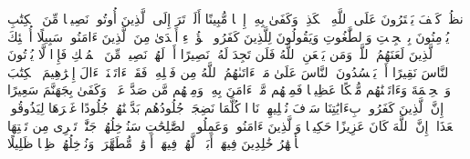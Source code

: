 \stopbuffer%
\startbuffer[\q:4:50]
ٱنظُرۡ كَیۡفَ یَفۡتَرُونَ عَلَى ٱللَّهِ ٱلۡكَذِبَۖ وَكَفَىٰ بِهِۦۤ إِثۡمࣰا مُّبِینًا%
\stopbuffer%
\startbuffer[\q:4:51]
أَلَمۡ تَرَ إِلَى ٱلَّذِینَ أُوتُوا۟ نَصِیبࣰا مِّنَ ٱلۡكِتَٰبِ یُؤۡمِنُونَ بِٱلۡجِبۡتِ وَٱلطَّٰغُوتِ وَیَقُولُونَ لِلَّذِینَ كَفَرُوا۟ هَٰۤؤُلَاۤءِ أَهۡدَىٰ مِنَ ٱلَّذِینَ ءَامَنُوا۟ سَبِیلًا%
\stopbuffer%
\startbuffer[\q:4:52]
أُو۟لَٰۤئِكَ ٱلَّذِینَ لَعَنَهُمُ ٱللَّهُۖ وَمَن یَلۡعَنِ ٱللَّهُ فَلَن تَجِدَ لَهُۥ نَصِیرًا%
\stopbuffer%
\startbuffer[\q:4:53]
أَمۡ لَهُمۡ نَصِیبࣱ مِّنَ ٱلۡمُلۡكِ فَإِذࣰا لَّا یُؤۡتُونَ ٱلنَّاسَ نَقِیرًا%
\stopbuffer%
\startbuffer[\q:4:54]
أَمۡ یَحۡسُدُونَ ٱلنَّاسَ عَلَىٰ مَاۤ ءَاتَىٰهُمُ ٱللَّهُ مِن فَضۡلِهِۦۖ فَقَدۡ ءَاتَیۡنَاۤ ءَالَ إِبۡرَٰهِیمَ ٱلۡكِتَٰبَ وَٱلۡحِكۡمَةَ وَءَاتَیۡنَٰهُم مُّلۡكًا عَظِیمࣰا%
\stopbuffer%
\startbuffer[\q:4:55]
فَمِنۡهُم مَّنۡ ءَامَنَ بِهِۦ وَمِنۡهُم مَّن صَدَّ عَنۡهُۚ وَكَفَىٰ بِجَهَنَّمَ سَعِیرًا%
\stopbuffer%
\startbuffer[\q:4:56]
إِنَّ ٱلَّذِینَ كَفَرُوا۟ بِءَایَٰتِنَا سَوۡفَ نُصۡلِیهِمۡ نَارࣰا كُلَّمَا نَضِجَتۡ جُلُودُهُم بَدَّلۡنَٰهُمۡ جُلُودًا غَیۡرَهَا لِیَذُوقُوا۟ ٱلۡعَذَابَۗ إِنَّ ٱللَّهَ كَانَ عَزِیزًا حَكِیمࣰا%
\stopbuffer%
\startbuffer[\q:4:57]
وَٱلَّذِینَ ءَامَنُوا۟ وَعَمِلُوا۟ ٱلصَّٰلِحَٰتِ سَنُدۡخِلُهُمۡ جَنَّٰتࣲ تَجۡرِی مِن تَحۡتِهَا ٱلۡأَنۡهَٰرُ خَٰلِدِینَ فِیهَاۤ أَبَدࣰاۖ لَّهُمۡ فِیهَاۤ أَزۡوَٰجࣱ مُّطَهَّرَةࣱۖ وَنُدۡخِلُهُمۡ ظِلࣰّا ظَلِیلًا%
\stopbuffer%
